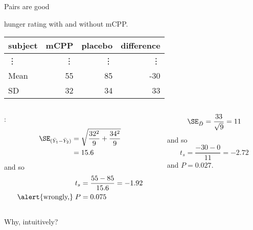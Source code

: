 \begin{frame}{Pairs are good}

     hunger rating with and without mCPP.
    \begin{center}
      \begin{tabular}{lrrr}
        \hline
        subject & mCPP & placebo & difference \\ 
        \hline
        \vdots & \vdots & \vdots & \vdots \\
        \hline
         Mean & 55 & 85 & -30 \\ 
         SD & 32 & 34 & 33 \\ 
         \hline
      \end{tabular}
    \end{center}

    \begin{columns}
      \begin{column}{.5\textwidth}
        :
      \begin{align*} 
        \SE_{(\bar Y_1 - \bar Y_2)} &= \sqrt{\frac{32^2}{9} + \frac{{34^2}}{9}} \\ 
        &= 15.6 
        \end{align*}
        and so
        \begin{align*}
      t_s &= \frac{55-85}{15.6} = -1.92  \\
      \text{\alert{wrongly,}} \; P&=0.075
    \end{align*}

      \end{column}
      \begin{column}{.5\textwidth}
        \begin{align*}
          \SE_{\bar D} = \frac{33}{\sqrt{9}} = 11
        \end{align*}
        and so
        \[  t_s = \frac{-30-0}{11} = -2.72 \]
        and $P = 0.027$.

      \end{column}
    \end{columns}

    \centering
    \alert{Why, intuitively?}

\end{frame}

